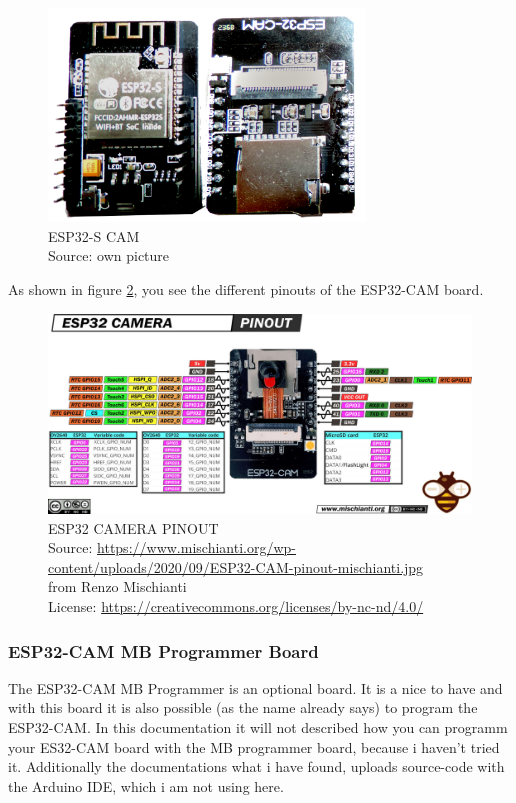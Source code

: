 \begin{figure}[H]
\centering
\includegraphics[width=0.75\textwidth]{esp32-s_overview}
\caption[ESP32-S-CAM]{ESP32-S CAM \\ Source: own picture}
\label{ESP32-S-CAM-overview}
\end{figure}

As shown in figure \ref{ESP32-CAM-pinout}, you see the different pinouts of the ESP32-CAM board.

\begin{figure}[H]
\centering
\includegraphics[width=\textwidth]{ESP32-CAM-pinout-mischianti}
\caption[ESP32 CAMERA PINOUT]{ESP32 CAMERA PINOUT \\ Source: \url{https://www.mischianti.org/wp-content/uploads/2020/09/ESP32-CAM-pinout-mischianti.jpg}\\ from Renzo Mischianti \\ License: \url{https://creativecommons.org/licenses/by-nc-nd/4.0/}}
\label{ESP32-CAM-pinout}
\end{figure}

\subsubsection{ESP32-CAM MB Programmer Board}
The ESP32-CAM MB Programmer is an optional board. It is a nice to have and with this board it is also possible (as the name already says) to program the ESP32-CAM. In this documentation it will not described how you can programm your ES32-CAM board with the MB programmer board, because i haven't tried it. Additionally the documentations what i have found, uploads source-code with the Arduino IDE, which i am not using here.

